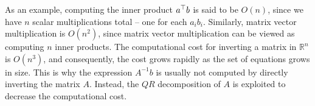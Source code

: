 \begin{enumerate}
As an example, computing the inner product $a^{\top} b$ is said to be $O(n)$, since we have $n$ scalar multiplications total -- one for each $a_i b_i$. Similarly, matrix vector multiplication is $O(n^2)$, since matrix vector multiplication can be viewed as computing $n$ inner products. The computational cost for inverting a matrix in $\mathbb R^n$ is $O(n^3)$, and consequently, the cost grows rapidly as the set of equations grows in size. This is why the expression $A^{-1}b$ is usually not computed by directly inverting the matrix $A$. Instead, the $QR$ decomposition of $A$ is exploited to decrease the computational cost.

\sol{}

\end{enumerate}